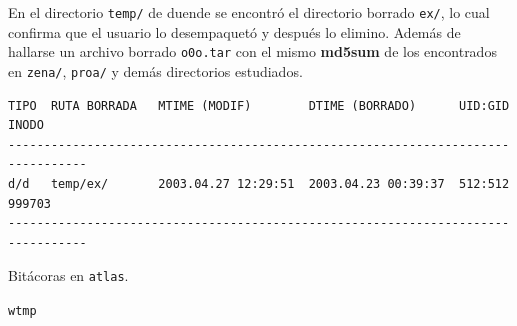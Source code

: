  En el directorio \texttt{temp/} de duende se encontró el directorio borrado
\texttt{ex/}, lo cual confirma que el usuario lo desempaquetó y después lo
elimino. Además de hallarse un archivo borrado \texttt{o0o.tar} con el mismo
\textbf{md5sum} de los encontrados en \texttt{zena/}, \texttt{proa/} y demás directorios
estudiados.

\vspace{1em}

\begin{lstlisting}[style=terminal]
TIPO  RUTA BORRADA   MTIME (MODIF)        DTIME (BORRADO)      UID:GID  INODO
---------------------------------------------------------------------------------
d/d   temp/ex/       2003.04.27 12:29:51  2003.04.23 00:39:37  512:512  999703
---------------------------------------------------------------------------------
\end{lstlisting}

\vspace{1em}


 Bitácoras en \texttt{atlas}.

\texttt{wtmp}

\vspace{1em}


